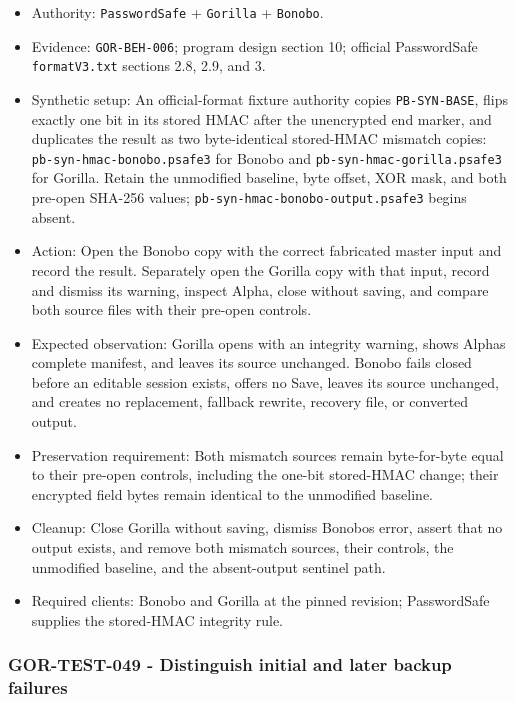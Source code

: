 \documentclass[
  letterpaper,
]{article}
\newcommand{\passthrough}[1]{#1}
\providecommand{\tightlist}{%
  \setlength{\itemsep}{0pt}\setlength{\parskip}{0pt}}
\begin{document}
\begin{itemize}
\tightlist
\item
  Authority: \nolinkurl{PasswordSafe} + \passthrough{\lstinline!Gorilla!} + \passthrough{\lstinline!Bonobo!}.
\item
  Evidence: \nolinkurl{GOR-BEH-006}; program design section 10; official PasswordSafe \nolinkurl{formatV3.txt} sections
  2.8, 2.9, and 3.
\item
  Synthetic setup: An official-format fixture authority copies \nolinkurl{PB-SYN-BASE}, flips exactly one bit in its
  stored HMAC after the unencrypted end marker, and duplicates the result as two byte-identical stored-HMAC mismatch
  copies: \nolinkurl{pb-syn-hmac-bonobo.psafe3} for Bonobo and \nolinkurl{pb-syn-hmac-gorilla.psafe3} for Gorilla.
  Retain the unmodified baseline, byte offset, XOR mask, and both pre-open SHA-256 values;
  \nolinkurl{pb-syn-hmac-bonobo-output.psafe3} begins absent.
\item
  Action: Open the Bonobo copy with the correct fabricated master input and record the result. Separately open the
  Gorilla copy with that input, record and dismiss its warning, inspect Alpha, close without saving, and compare both
  source files with their pre-open controls.
\item
  Expected observation: Gorilla opens with an integrity warning, shows Alpha\textquotesingle s complete manifest, and
  leaves its source unchanged. Bonobo fails closed before an editable session exists, offers no Save, leaves its source
  unchanged, and creates no replacement, fallback rewrite, recovery file, or converted output.
\item
  Preservation requirement: Both mismatch sources remain byte-for-byte equal to their pre-open controls, including the
  one-bit stored-HMAC change; their encrypted field bytes remain identical to the unmodified baseline.
\item
  Cleanup: Close Gorilla without saving, dismiss Bonobo\textquotesingle s error, assert that no output exists, and
  remove both mismatch sources, their controls, the unmodified baseline, and the absent-output sentinel path.
\item
  Required clients: Bonobo and Gorilla at the pinned revision; PasswordSafe supplies the stored-HMAC integrity rule.
\end{itemize}

\subsubsection{GOR-TEST-049 - Distinguish initial and later backup
failures}\label{gor-test-049---distinguish-initial-and-later-backup-failures}
\end{document}
